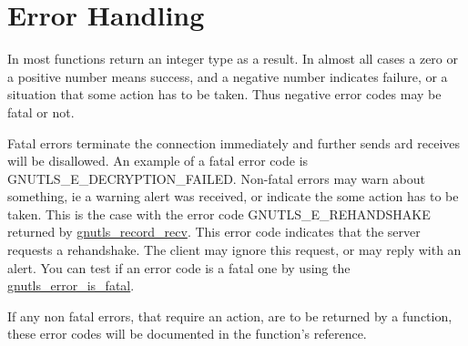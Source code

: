 \section{Error Handling}
\par
In \gnutls{} most functions return an integer type as a result.
In almost all cases a zero or a positive number means success, and
a negative number indicates failure, or a situation that some
action has to be taken. Thus negative error codes may be fatal
or not. 
\par 
Fatal errors terminate the connection immediately and
further sends ard receives will be disallowed. An example of
a fatal error code is GNUTLS\_E\_DECRYPTION\_FAILED. Non-fatal errors
may warn about something, ie a warning alert was received, or
indicate the some action has to be taken. This is the case with
the error code GNUTLS\_E\_REHANDSHAKE returned by 
\hyperref{gnutls\_record\_recv()}{gnutls\_record\_recv() (see Section }{)}{gnutls_record_recv}.
This error code indicates that the server requests a rehandshake. The client
may ignore this request, or may reply with an alert.
You can test if an error code is a fatal one by using the
\hyperref{gnutls\_error\_is\_fatal()}{gnutls\_error\_is\_fatal() (see Section }{)}{gnutls_error_is_fatal}.
\par
If any non fatal errors, that require an action, are to be returned by a
function, these error codes will be documented
in the function's reference.

